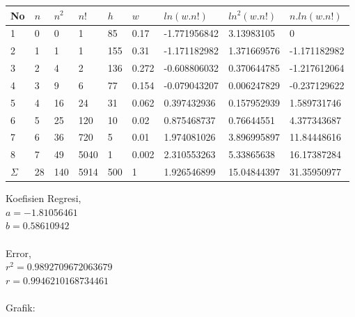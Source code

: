 \documentclass{article}
\begin{document}
			\begin{longtable}{@{}lllllllll@{}} 
					\toprule
					No  & $n$  & $n^{2}$ & $n!$   & $h$   & $w$     & $ln(w.n!)$     & $ln^{2}(w.n!)$ & $n.ln(w.n!)$   \\ \midrule
				\endfirsthead
				\endhead
				\bottomrule
				\endfoot
				\endlastfoot
				1   & 0  & 0                    & 1    & 85  & 0.17  & -1.771956842 & 3.13983105                  & 0            \\
				2   & 1  & 1                    & 1    & 155 & 0.31  & -1.171182982 & 1.371669576                 & -1.171182982 \\
				3   & 2  & 4                    & 2    & 136 & 0.272 & -0.608806032 & 0.370644785                 & -1.217612064 \\
				4   & 3  & 9                    & 6    & 77  & 0.154 & -0.079043207 & 0.006247829                 & -0.237129622 \\
				5   & 4  & 16                   & 24   & 31  & 0.062 & 0.397432936  & 0.157952939                 & 1.589731746  \\
				6   & 5  & 25                   & 120  & 10  & 0.02  & 0.875468737  & 0.76644551                  & 4.377343687  \\
				7   & 6  & 36                   & 720  & 5   & 0.01  & 1.974081026  & 3.896995897                 & 11.84448616  \\
				8   & 7  & 49                   & 5040 & 1   & 0.002 & 2.310553263  & 5.33865638                  & 16.17387284  \\* \midrule
				$\Sigma$ & 28 & 140                  & 5914 & 500 & 1     & 1.926546899  & 15.04844397                 & 31.35950977  \\* \bottomrule
				\end{longtable} \newpage
			\hspace{-0.6cm}Koefisien Regresi, \\
			$a = -1.81056461$ \\
			$b = 0.58610942$ \\ \\
			Error,\\
			$r^{2} = 0.9892709672063679$ \\
			$r = 0.9946210168734461 $ \\ \\
			Grafik: 
\end{document}

